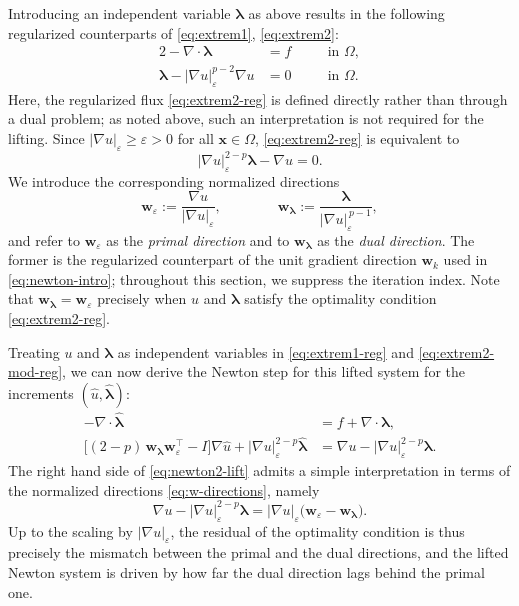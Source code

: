 \documentclass[11pt,pdflatex,sn-mathphys-num]{sn-jnl}
\theoremstyle{thmstyleone}%
\theoremstyle{thmstyletwo}%
\theoremstyle{thmstylethree}%
\newcommand{\bs}[1]{\ensuremath{\boldsymbol{#1}}}
\begin{document}
Introducing an independent variable $\bs\lambda$ as above results in
the following regularized counterparts of \eqref{eq:extrem1}, \eqref{eq:extrem2}:
\begin{alignat}{2}
-\nabla\!\cdot\!\bs\lambda &= f \quad &&\text{in }\Omega,\label{eq:extrem1-reg}\\
\bs\lambda - |\nabla u|_\varepsilon^{p-2}\nabla u &= 0 &&\text{in }\Omega.\label{eq:extrem2-reg}
\end{alignat}
Here, the regularized flux \eqref{eq:extrem2-reg} is defined directly rather than through a dual problem; as noted above, such an interpretation is not required for the lifting.
Since $|\nabla u|_\varepsilon\geq\varepsilon>0$ for all $\bs x\in\Omega$, \eqref{eq:extrem2-reg} is equivalent to
\begin{equation}\label{eq:extrem2-mod-reg}
|\nabla u|_\varepsilon^{2-p}\bs\lambda - \nabla u=0.
\end{equation}
We introduce the corresponding normalized directions
\begin{equation}\label{eq:w-directions}
  \bs w_\varepsilon := \frac{\nabla u}{|\nabla u|_\varepsilon},
  \qquad\qquad
  \bs w_{\bs\lambda} := \frac{\bs\lambda}{|\nabla u|_\varepsilon^{\,p-1}},
\end{equation}
and refer to $\bs w_\varepsilon$ as the \emph{primal direction} and to $\bs w_{\bs\lambda}$ as the \emph{dual direction}. The former is the regularized counterpart of the unit gradient direction $\bs w_k$ used in \eqref{eq:newton-intro}; throughout this section, we suppress the iteration index. Note that $\bs w_{\bs\lambda}=\bs w_\varepsilon$ precisely when $u$ and $\bs\lambda$ satisfy the optimality condition \eqref{eq:extrem2-reg}.



Treating $u$ and $\bs \lambda$ as independent variables in \eqref{eq:extrem1-reg} and \eqref{eq:extrem2-mod-reg}, we can now derive the Newton step for this lifted system for the increments $(\hat u,\hat{\bs\lambda})$:
\begin{align}
  -\nabla\cdot \hat{\bs \lambda} &= f + \nabla\cdot\bs \lambda, \label{eq:newton1-lift}\\
  \bigl[(2-p)\,\bs w_{\bs\lambda}\bs w_\varepsilon^\top - I\bigr]\nabla \hat{u}
  + |\nabla u|_\varepsilon^{2-p}\hat{\bs \lambda}
  &= \nabla u - |\nabla u|_\varepsilon^{2-p}\bs \lambda.\label{eq:newton2-lift}
\end{align}
The right hand side of \eqref{eq:newton2-lift} admits a simple interpretation in terms of the normalized directions \eqref{eq:w-directions}, namely
\begin{equation*}
  \nabla u - |\nabla u|_\varepsilon^{2-p}\bs\lambda = |\nabla u|_\varepsilon\bigl(\bs w_\varepsilon - \bs w_{\bs\lambda}\bigr).
\end{equation*}
Up to the scaling by $|\nabla u|_\varepsilon$, the residual of the optimality condition is thus precisely the mismatch between the primal and the dual directions, and the lifted Newton system is driven by how far the dual direction lags behind the primal one.
\end{document}
